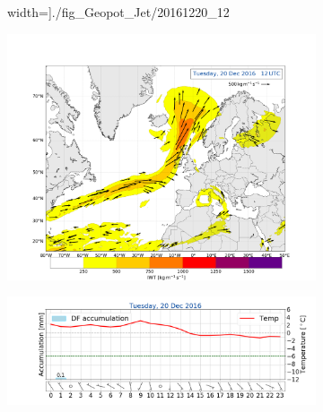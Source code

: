 \begin{figure}
\begin{subfigure}[b]{0.49\textwidth}
         width=\textwidth]{./fig_Geopot_Jet/20161220_12}
        \caption{}
    \end{subfigure}
    \begin{subfigure}[b]{0.49\textwidth}
    	\includegraphics[trim={4.2cm 0cm 4.3cm 5.1cm},clip,
         width=\textwidth]{./fig_Atm_Riv/20161220_12}
        \caption{}
    \end{subfigure}
    \begin{subfigure}[b]{0.49\textwidth}
    	\includegraphics[trim={4.9cm 1.cm 1.5cm 1cm},clip,
		width=\textwidth]{./fig_weathermast/T_P_U_20161220}
        \caption{}
    \end{subfigure}
\end{figure}


% 
